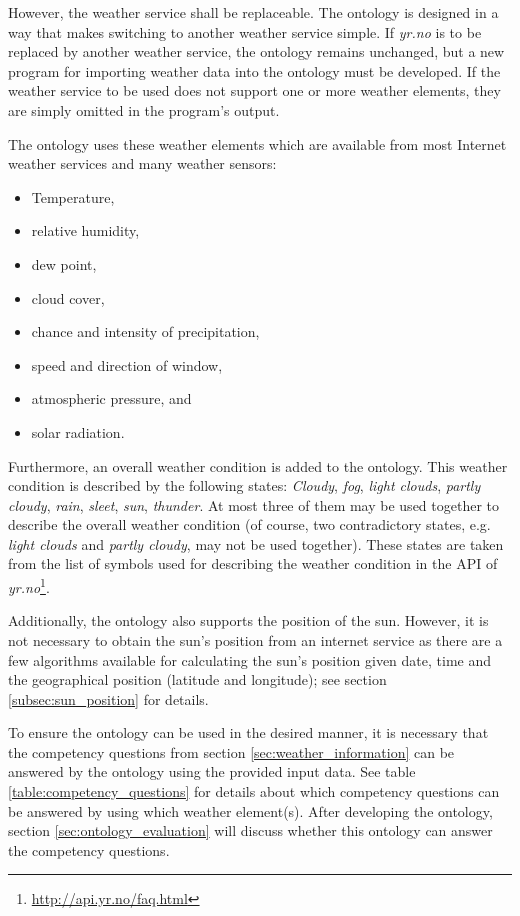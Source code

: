 However, the weather service shall be replaceable. The ontology is designed in a way that makes switching to another weather service simple. If \emph{yr.no} is to be replaced by another weather service, the ontology remains unchanged, but a new program for importing weather data into the ontology must be developed. If the weather service to be used does not support one or more weather elements, they are simply omitted in the program's output.

The ontology uses these weather elements which are available from most Internet weather services and many weather sensors:
\begin{itemize}
  \item Temperature,
  \item relative humidity,
  \item dew point,
  \item cloud cover,
  \item chance and intensity of precipitation,
  \item speed and direction of window,
  \item atmospheric pressure, and
  \item solar radiation.
\end{itemize}

Furthermore, an overall weather condition is added to the ontology. This weather condition is described by the following states: \emph{Cloudy}, \emph{fog}, \emph{light clouds}, \emph{partly cloudy}, \emph{rain}, \emph{sleet}, \emph{sun}, \emph{thunder}. At most three of them may be used together to describe the overall weather condition (of course, two contradictory states, e.g. \emph{light clouds} and \emph{partly cloudy}, may not be used together). These states are taken from the list of symbols used for describing the weather condition in the API of \emph{yr.no}\footnote{\href{http://api.yr.no/faq.html}{http://api.yr.no/faq.html}}.

Additionally, the ontology also supports the position of the sun. However, it is not necessary to obtain the sun's position from an internet service as there are a few algorithms available for calculating the sun's position given date, time and the geographical position (latitude and longitude); see section \ref{subsec:sun_position} for details.

To ensure the ontology can be used in the desired manner, it is necessary that the competency questions from section \ref{sec:weather_information} can be answered by the ontology using the provided input data. See table \ref{table:competency_questions} for details about which competency questions can be answered by using which weather element(s). After developing the ontology, section \ref{sec:ontology_evaluation} will discuss whether this ontology can answer the competency questions.

